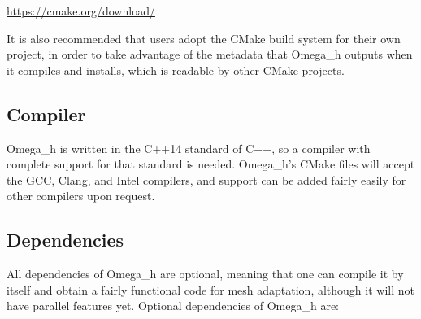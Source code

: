 \documentclass{article}
\begin{document}
\url{https://cmake.org/download/}

It is also recommended that users adopt the CMake build
system for their own project, in order to take advantage
of the metadata that Omega\_h outputs when it compiles
and installs, which is readable by other CMake projects.

\subsection{Compiler}

Omega\_h is written in the C++14 standard of C++,
so a compiler with complete support for that standard
is needed.
Omega\_h's CMake files will accept the GCC, Clang,
and Intel compilers, and support can be added
fairly easily for other compilers upon request.

\subsection{Dependencies}

All dependencies of Omega\_h are optional,
meaning that one can compile it by itself and obtain a fairly
functional code for mesh adaptation, although
it will not have parallel features yet.
Optional dependencies of Omega\_h are:
\end{document}
